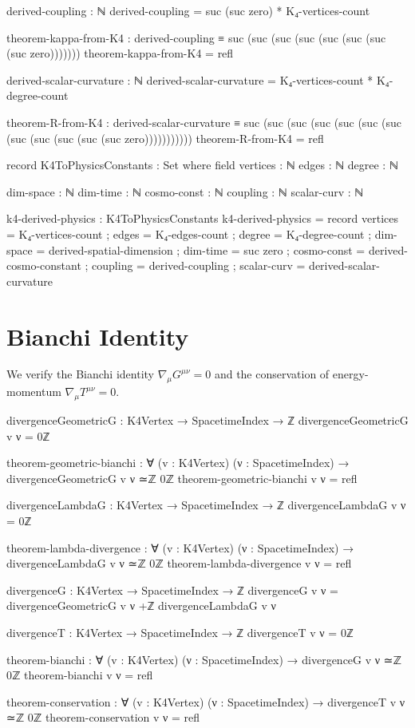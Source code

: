 \documentclass[11pt,a4paper]{book}
\begin{document}
\begin{code}
derived-coupling : ℕ
derived-coupling = suc (suc zero) * K₄-vertices-count

theorem-kappa-from-K4 : derived-coupling ≡ suc (suc (suc (suc (suc (suc (suc (suc zero)))))))
theorem-kappa-from-K4 = refl

derived-scalar-curvature : ℕ
derived-scalar-curvature = K₄-vertices-count * K₄-degree-count

theorem-R-from-K4 : derived-scalar-curvature ≡ suc (suc (suc (suc (suc (suc (suc (suc (suc (suc (suc (suc zero)))))))))))
theorem-R-from-K4 = refl

record K4ToPhysicsConstants : Set where
  field
    vertices : ℕ
    edges    : ℕ
    degree   : ℕ
    
    dim-space : ℕ
    dim-time  : ℕ
    cosmo-const : ℕ
    coupling : ℕ
    scalar-curv : ℕ

k4-derived-physics : K4ToPhysicsConstants
k4-derived-physics = record
  { vertices = K₄-vertices-count
  ; edges = K₄-edges-count
  ; degree = K₄-degree-count
  ; dim-space = derived-spatial-dimension
  ; dim-time = suc zero
  ; cosmo-const = derived-cosmo-constant
  ; coupling = derived-coupling
  ; scalar-curv = derived-scalar-curvature
  }
\end{code}

\section{Bianchi Identity}

We verify the Bianchi identity $\nabla_\mu G^{\mu\nu} = 0$ and the conservation of energy-momentum $\nabla_\mu T^{\mu\nu} = 0$.

\begin{code}
divergenceGeometricG : K4Vertex → SpacetimeIndex → ℤ
divergenceGeometricG v ν = 0ℤ

theorem-geometric-bianchi : ∀ (v : K4Vertex) (ν : SpacetimeIndex) → 
  divergenceGeometricG v ν ≃ℤ 0ℤ
theorem-geometric-bianchi v ν = refl

divergenceLambdaG : K4Vertex → SpacetimeIndex → ℤ
divergenceLambdaG v ν = 0ℤ

theorem-lambda-divergence : ∀ (v : K4Vertex) (ν : SpacetimeIndex) →
  divergenceLambdaG v ν ≃ℤ 0ℤ
theorem-lambda-divergence v ν = refl

divergenceG : K4Vertex → SpacetimeIndex → ℤ
divergenceG v ν = divergenceGeometricG v ν +ℤ divergenceLambdaG v ν

divergenceT : K4Vertex → SpacetimeIndex → ℤ
divergenceT v ν = 0ℤ

theorem-bianchi : ∀ (v : K4Vertex) (ν : SpacetimeIndex) → divergenceG v ν ≃ℤ 0ℤ
theorem-bianchi v ν = refl

theorem-conservation : ∀ (v : K4Vertex) (ν : SpacetimeIndex) → divergenceT v ν ≃ℤ 0ℤ
theorem-conservation v ν = refl
\end{code}
\end{document}
